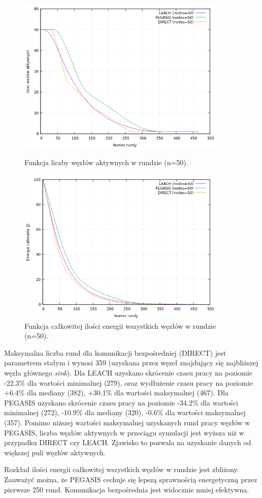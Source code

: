 \documentclass[a4paper,12pt,twoside,openany]{report}
\begin{document}
\begin{figure}[H]
 \centering
 \includegraphics[width=10cm]{images/gnuplot/test_2/nodes_in_round_50.png}
 \caption{Funkcja liczby węzłów aktywnych w rundzie (n=50).}
 \includegraphics[width=10cm]{images/gnuplot/test_2/energy_in_round_50.png}
 \caption{Funkcja całkowitej ilości energii wszystkich węzłów w rundzie (n=50).}
\end{figure}

\par
Maksymalna liczba rund dla komunikacji bezpośredniej (DIRECT) jest parametrem stałym i wynosi 359 (uzyskana przez węzeł znajdujący się najbliższej węzła głównego \textit{sink}).
Dla LEACH uzyskano skrócenie czasu pracy na poziomie -22.3\% dla wartości minimalnej (279), oraz wydłużenie czasu pracy na poziomie +6.4\% dla mediany (382), +30.1\% dla wartości maksymalnej (467).
Dla PEGASIS uzyskano skrócenie czasu pracy na poziomie -34.2\% dla wartości minimalnej (272), -10.9\% dla mediany (320), -0.6\% dla wartości maksymalnej (357).
Pomimo niższej wartości maksymalnej uzyskanych rund pracy węzłów w PEGASIS, liczba węzłów aktywnych w przeciągu symulacji jest wyższa niż w przypadku DIRECT czy LEACH.
Zjawisko to pozwala na uzyskanie danych od większej puli węzłów aktywnych.
\par
Rozkład ilości energii całkowitej wszystkich węzłów w rundzie jest zbliżony.
Zauważyć można, że PEGASIS cechuje się lepszą sprawnością energetyczną przez pierwsze 250 rund.  Komunikacja bezpośrednia jest widocznie mniej efektywna.
\end{document}
